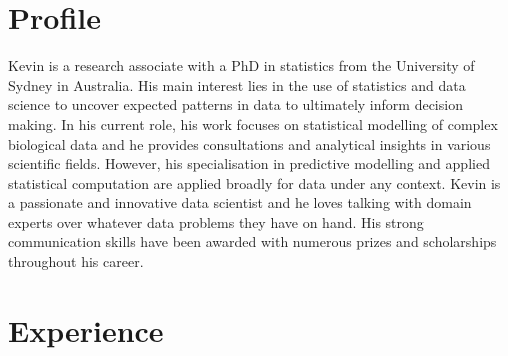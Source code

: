 \documentclass[12pt,a4paper,sans]{moderncv} %
\begin{document}
	
	\section{Profile}
	
	
	Kevin is a research associate with a PhD in statistics from the University of Sydney in Australia. His main interest lies in the use of statistics and data science to uncover expected patterns in data to ultimately inform decision making. In his current role, his work focuses on statistical modelling of complex biological data and he provides consultations and analytical insights in various scientific fields. However, his specialisation in predictive modelling and applied statistical computation are applied broadly for data under any context. Kevin is a passionate and innovative data scientist and he loves talking with domain experts over whatever data problems they have on hand. His strong communication skills have been awarded with numerous prizes and scholarships throughout his career. 
	
	
	\section{Experience}
	
	
	
\end{document}
